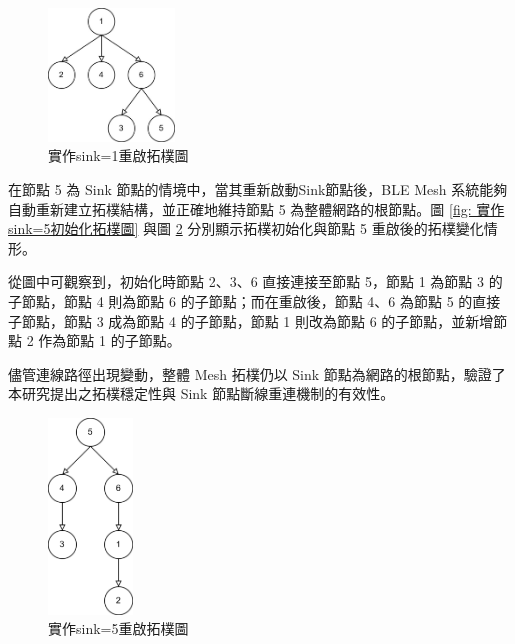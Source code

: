 \begin{ZhChapter}
\begin{figure}[H]
    \centering
    \includegraphics[width = 0.3\textwidth]{image/實作sink=1重啟拓樸圖.jpg}
    \caption{實作sink=1重啟拓樸圖}
    \label{fig: 實作sink=1重啟拓樸圖}
\end{figure}

在節點 5 為 Sink 節點的情境中，當其重新啟動Sink節點後，BLE Mesh 系統能夠自動重新建立拓樸結構，並正確地維持節點 5 為整體網路的根節點。圖 \ref{fig: 實作sink=5初始化拓樸圖} 與圖 \ref{fig: 實作sink=5重啟拓樸圖} 分別顯示拓樸初始化與節點 5 重啟後的拓樸變化情形。

從圖中可觀察到，初始化時節點 2、3、6 直接連接至節點 5，節點 1 為節點 3 的子節點，節點 4 則為節點 6 的子節點；而在重啟後，節點 4、6 為節點 5 的直接子節點，節點 3 成為節點 4 的子節點，節點 1 則改為節點 6 的子節點，並新增節點 2 作為節點 1 的子節點。

儘管連線路徑出現變動，整體 Mesh 拓樸仍以 Sink 節點為網路的根節點，驗證了本研究提出之拓樸穩定性與 Sink 節點斷線重連機制的有效性。


\begin{figure}[H]
    \centering
    \includegraphics[width = 0.2\textwidth]{image/實作sink=5重啟拓樸圖.jpg}
    \caption{實作sink=5重啟拓樸圖}
    \label{fig: 實作sink=5重啟拓樸圖}
\end{figure}


\end{ZhChapter}

